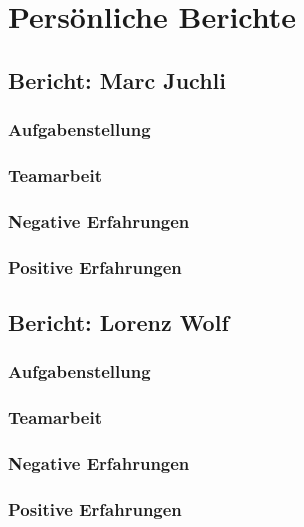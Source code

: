 \chapter{Persönliche Berichte}

\section{Bericht: Marc Juchli}

\subsection{Aufgabenstellung}
\subsection{Teamarbeit}
\subsection{Negative Erfahrungen}
\subsection{Positive Erfahrungen}


\section{Bericht: Lorenz Wolf}

\subsection{Aufgabenstellung}
\subsection{Teamarbeit}
\subsection{Negative Erfahrungen}
\subsection{Positive Erfahrungen}
